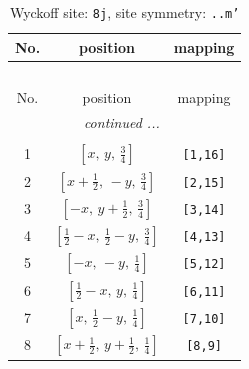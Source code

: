 \documentclass[fleqn,8pt]{jsarticle}
\begin{document}
\begin{longtable}{ccc}
\caption{Wyckoff site: {\tt 8j}, site symmetry: {\tt ..m'}}
 \\
 \hline \hline
No. & position & mapping \\ \hline \endfirsthead

\multicolumn{2}{l}{\tablename\ \thetable{}} \\
 \hline \hline
No. & position & mapping \\ \hline \endhead

 \hline \hline
\multicolumn{2}{r}{\footnotesize\it continued ...} \\ \endfoot

 \hline \hline
\multicolumn{2}{r}{} \\ \endlastfoot

1 & $\left[ x,\, y,\, \frac{3}{4} \right]$ & {\tt [1,16]} \\ \hline
2 & $\left[ x + \frac{1}{2},\, - y,\, \frac{3}{4} \right]$ & {\tt [2,15]} \\ \hline
3 & $\left[ - x,\, y + \frac{1}{2},\, \frac{3}{4} \right]$ & {\tt [3,14]} \\ \hline
4 & $\left[ \frac{1}{2} - x,\, \frac{1}{2} - y,\, \frac{3}{4} \right]$ & {\tt [4,13]} \\ \hline
5 & $\left[ - x,\, - y,\, \frac{1}{4} \right]$ & {\tt [5,12]} \\ \hline
6 & $\left[ \frac{1}{2} - x,\, y,\, \frac{1}{4} \right]$ & {\tt [6,11]} \\ \hline
7 & $\left[ x,\, \frac{1}{2} - y,\, \frac{1}{4} \right]$ & {\tt [7,10]} \\ \hline
8 & $\left[ x + \frac{1}{2},\, y + \frac{1}{2},\, \frac{1}{4} \right]$ & {\tt [8,9]} \\
\end{longtable}
\renewcommand{\arraystretch}{1.2}
\end{document}
